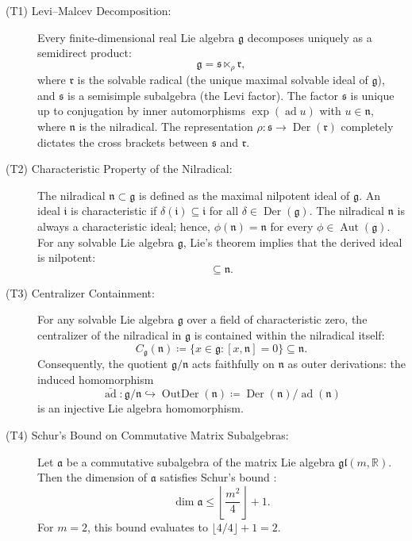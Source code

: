 \documentclass[11pt,a4paper]{article}
\theoremstyle{definition}
\theoremstyle{remark}
\newcommand{\R}{\mathbb{R}}
\newcommand{\g}{\mathfrak{g}}
\newcommand{\n}{\mathfrak{n}}
\newcommand{\s}{\mathfrak{s}}
\newcommand{\rr}{\mathfrak{r}}
\newcommand{\ad}{\operatorname{ad}}
\newcommand{\Aut}{\operatorname{Aut}}
\newcommand{\Der}{\operatorname{Der}}
\newcommand{\OutDer}{\operatorname{OutDer}}
\begin{document}
\begin{description}
    \item[(T1) Levi--Malcev Decomposition:] Every finite-dimensional real Lie algebra $\g$ decomposes uniquely as a semidirect product:
    \begin{equation}
        \g = \s \ltimes_\rho \rr,
    \end{equation}
    where $\rr$ is the solvable radical (the unique maximal solvable ideal of $\g$), and $\s$ is a semisimple subalgebra (the Levi factor). The factor $\s$ is unique up to conjugation by inner automorphisms $\exp(\ad u)$ with $u \in \n$, where $\n$ is the nilradical. The representation $\rho \colon \s \to \Der(\rr)$ completely dictates the cross brackets between $\s$ and $\rr$.
    
    \item[(T2) Characteristic Property of the Nilradical:] The nilradical $\n \subset \g$ is defined as the maximal nilpotent ideal of $\g$. An ideal $\mathfrak{i}$ is characteristic if $\delta(\mathfrak{i}) \subseteq \mathfrak{i}$ for all $\delta \in \Der(\g)$. The nilradical $\n$ is always a characteristic ideal; hence, $\phi(\n) = \n$ for every $\phi \in \Aut(\g)$. For any solvable Lie algebra $\g$, Lie's theorem implies that the derived ideal is nilpotent:
    \begin{equation}
        [\g, \g] \subseteq \n.
    \end{equation}
    
    \item[(T3) Centralizer Containment:] For any solvable Lie algebra $\g$ over a field of characteristic zero, the centralizer of the nilradical in $\g$ is contained within the nilradical itself:
    \begin{equation}
        C_\g(\n) \coloneqq \{ x \in \g : [x, \n] = 0 \} \subseteq \n.
    \end{equation}
    Consequently, the quotient $\g/\n$ acts faithfully on $\n$ as outer derivations: the induced homomorphism
    \begin{equation}
        \bar{\ad} \colon \g / \n \hookrightarrow \OutDer(\n) \coloneqq \Der(\n) / \ad(\n)
    \end{equation}
    is an injective Lie algebra homomorphism.
    
    \item[(T4) Schur's Bound on Commutative Matrix Subalgebras:] Let $\mathfrak{a}$ be a commutative subalgebra of the matrix Lie algebra $\mathfrak{gl}(m, \R)$. Then the dimension of $\mathfrak{a}$ satisfies Schur's bound \citep{Schur1905}:
    \begin{equation}
        \dim \mathfrak{a} \le \left\lfloor \frac{m^2}{4} \right\rfloor + 1.
    \end{equation}
    For $m = 2$, this bound evaluates to $\lfloor 4/4 \rfloor + 1 = 2$.
    

\end{description}
\end{document}
